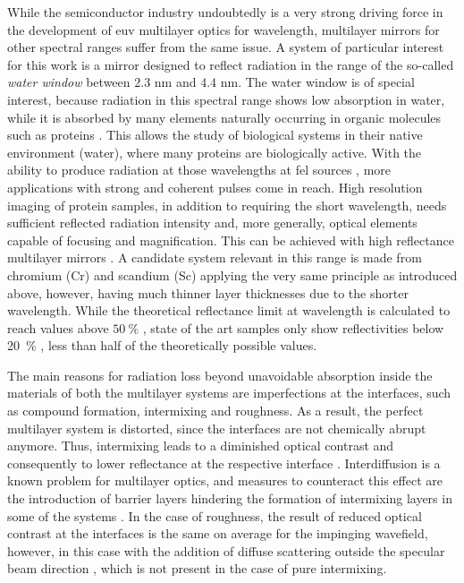 While the semiconductor industry undoubtedly is a very strong driving force in the development of \gls{euv} multilayer optics for  wavelength,  multilayer mirrors for other spectral ranges suffer from the same issue. A system of particular interest for this work is a mirror designed to reflect radiation in the range of the so-called \emph{water window} between $2.3$ nm and $4.4$ nm. The water window is of special interest, because radiation in this spectral range shows low absorption in water, while it is absorbed by many elements naturally occurring in organic molecules such as proteins \cite{kirz_soft_1995}. This allows the study of biological systems in their native environment (water), where many proteins are biologically active. With the ability to produce radiation at those wavelengths at \gls{fel} sources \cite{ackermann_operation_2007, schreiber_first_2011}, more applications with strong and coherent pulses come in reach. High resolution imaging of protein samples, in addition to requiring the short wavelength, needs sufficient reflected radiation intensity and, more generally, optical elements capable of focusing and magnification. This can be achieved with high reflectance multilayer mirrors \cite{hertz_normal-incidence_1999,legall_compact_2012}. A candidate system relevant in this range is made from chromium (Cr) and scandium (Sc) applying the very same principle as introduced above, however, having much thinner layer thicknesses due to the shorter wavelength. While the theoretical reflectance limit at  wavelength is calculated to reach values above $\SI{50}{\percent}$ \cite{schafers_cr/sc_1998}, state of the art samples only show reflectivities below \SI{20}{\percent} \cite{eriksson_14.5_2003, yulin_high-performance_2004}, less than half of the theoretically possible values.

The main reasons for radiation loss beyond unavoidable absorption inside the materials of both the multilayer systems are imperfections at the interfaces, such as compound formation, intermixing and roughness. As a result, the perfect multilayer system is distorted, since the interfaces are not chemically abrupt anymore. Thus, intermixing leads to a diminished optical contrast and consequently to lower reflectance at the respective interface \cite{nakajima_interdiffusion_1988}. Interdiffusion is a known problem for multilayer optics, and measures to counteract this effect are the introduction of barrier layers hindering the formation of intermixing layers in some of the systems \cite{braun_grenzflachen-optimierte_2003,braun_mo/si_2002}. In the case of roughness, the result of reduced optical contrast at the interfaces is the same on average for the impinging wavefield, however, in this case with the addition of diffuse scattering outside the specular beam direction \cite{sinha_x-ray_1994}, which is not present in the case of pure intermixing.

